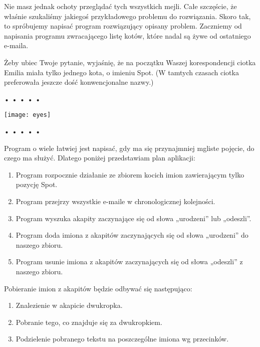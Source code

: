     
Nie masz jednak ochoty przeglądać tych wszystkich mejli. Całe szczęście, że właśnie szukaliśmy jakiegoś przykładowego problemu do rozwiązania. Skoro tak, to spróbujemy napisać program rozwiązujący opisany problem. Zaczniemy od napisania programu zwracającego listę kotów, które nadal są żywe od ostatniego e-maila.

    
Żeby ubiec Twoje pytanie, wyjaśnię, że na początku Waszej korespondencji ciotka Emilia miała tylko jednego kota, o imieniu Spot. (W tamtych czasach ciotka preferowała jeszcze dość konwencjonalne nazwy.)

  
  
\begin{center}
• • • • •
\end{center}
  
\bigskip 

\centerline{\texttt{[image: eyes]}} 

\smallskip
  
\begin{center}
• • • • •
\end{center}
  
    
Program o wiele łatwiej jest napisać, gdy ma się przynajmniej mgliste pojęcie, do czego ma służyć. Dlatego poniżej przedstawiam plan aplikacji:

\begin{enumerate}
      \item Program rozpocznie działanie ze zbiorem kocich imion zawierającym tylko pozycję Spot.
      \item Program przejrzy wszystkie e-maile w chronologicznej kolejności.
      \item Program wyszuka akapity zaczynające się od słowa „urodzeni” lub „odeszli”.
      \item Program doda imiona z akapitów zaczynających się od słowa „urodzeni” do naszego zbioru.
      \item Program usunie imiona z akapitów zaczynających się od słowa „odeszli” z naszego zbioru.
\end{enumerate}
    
Pobieranie imion z akapitów będzie odbywać się następująco:

\begin{enumerate}
      \item Znalezienie w akapicie dwukropka.
      \item Pobranie tego, co znajduje się za dwukropkiem.
      \item Podzielenie pobranego tekstu na poszczególne imiona wg przecinków.
\end{enumerate}
    
